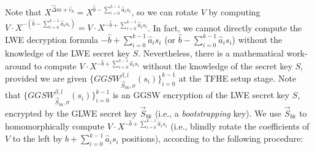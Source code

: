Note that $X^{\hat{\Delta} m + \hat{e}_b} = X^{\hat{b} - \sum_{i=0}^{k-1}{\hat{a}_is_i}}$, so we can rotate $V$ by computing $V \cdot X^{-(\hat{b} - \sum_{i=0}^{k-1}{\hat{a}_is_i})} = V \cdot X^{-\hat{b} + \sum_{i=0}^{k-1}{\hat{a}_is_i}}$. In fact, we cannot directly compute the LWE decryption formula $-\hat{b} + \sum_{i=0}^{k-1}{\hat{a}_is_i}$ (or $\hat{b} - \sum_{i=0}^{k-1}{\hat{a}_is_i}$) without the knowledge of the LWE secret key $S$. Nevertheless, there is a mathematical work-around to compute $V \cdot X^{-\hat{b} + \sum_{i=0}^{k-1}{\hat{a}_is_i}}$ without the knowledge of the secret key $S$, provided we are given $\{GGSW_{\vec{S}_{bk}, \sigma}^{\beta, l}(s_i)\}_{i=0}^{k-1}$ at the TFHE setup stage. Note that $\{GGSW_{\vec{S}_{bk}, \sigma}^{\beta, l}(s_i)\}_{i=0}^{k-1}$ is an GGSW encryption of the LWE secret key $S$, encrypted by the GLWE secret key $\vec{S}_{bk}$ (i.e., a \textit{bootstrapping} key). We use $\vec{S}_{bk}$ to homomorphically compute $V \cdot X^{-\hat{b} + \sum_{i=0}^{k-1}{\hat{a}_is_i}}$ (i.e., blindly rotate the coefficients of $V$ to the left by $\hat{b} + \sum_{i=0}^{k-1}{\hat{a}_is_i}$ positions), according to the following procedure:

